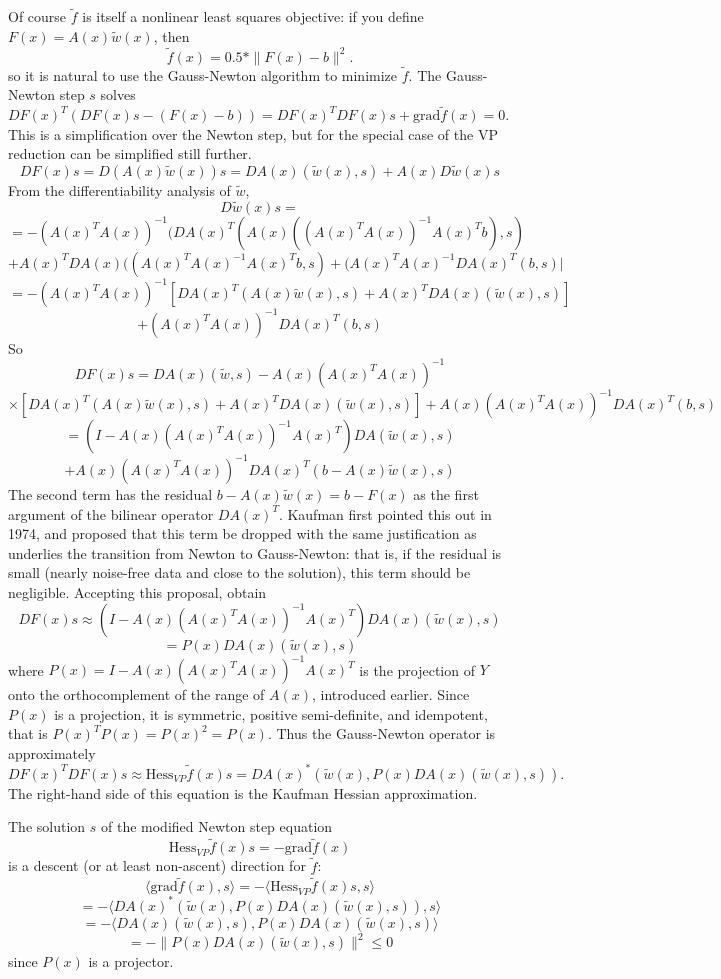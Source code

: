 Of course $\tilde{f}$ is itself a nonlinear least squares objective: if you define $F(x)=A(x)\tilde{w}(x)$, then 
$$
\tilde{f}(x) = 0.5*\|F(x)-b\|^2.
$$
so it is natural to use the Gauss-Newton algorithm to minimize $\tilde{f}$. The Gauss-Newton step $s$ solves $DF(x)^T(DF(x)s-(F(x)-b))=DF(x)^TDF(x)s+\mbox{grad}\tilde{f}(x)=0$. This is a simplification over the Newton step, but for the special case of the VP reduction can be simplified still further.
$$
DF(x)s = D(A(x)\tilde{w}(x))s = DA(x)(\tilde{w}(x),s) + A(x)D\tilde{w}(x)s
$$
From the differentiability analysis of $\tilde{w}$,
$$
D\tilde{w}(x)s = 
$$
$$
=-(A(x)^TA(x))^{-1}(DA(x)^T(A(x)((A(x)^TA(x))^{-1}A(x)^Tb),s)
$$
$$
+ A(x)^T DA(x)((A(x)^TA(x)^{-1}A(x)^Tb,s) + (A(x)^TA(x)^{-1}DA(x)^T(b,s)|
$$
$$
= -(A(x)^TA(x))^{-1}[DA(x)^T(A(x)\tilde{w}(x),s) + A(x)^TDA(x)(\tilde{w}(x),s)]
$$
$$
+ (A(x)^TA(x))^{-1}DA(x)^T(b,s)
$$
So 
$$
DF(x)s = DA(x)(\tilde{w},s) - A(x) (A(x)^TA(x))^{-1}
$$
$$
\times [DA(x)^T(A(x)\tilde{w}(x),s) + A(x)^TDA(x)(\tilde{w}(x),s)] + A(x)(A(x)^TA(x))^{-1}DA(x)^T(b,s)
$$
$$
= (I-A(x)(A(x)^TA(x))^{-1}A(x)^T)DA(\tilde{w}(x),s)
$$
$$
+ A(x)(A(x)^TA(x))^{-1}DA(x)^T(b-A(x)\tilde{w}(x),s)
$$
The second term has the residual $b-A(x)\tilde{w}(x)=b-F(x)$ as the first argument of the bilinear operator $DA(x)^T$. Kaufman first pointed this out in 1974, and proposed that this term be dropped with the same justification as underlies the transition from Newton to Gauss-Newton: that is, if the residual is small (nearly noise-free data and close to the solution), this term should be negligible. Accepting this proposal, obtain 
$$
DF(x)s \approx (I-A(x)(A(x)^TA(x))^{-1}A(x)^T)DA(x)(\tilde{w}(x),s)
$$
$$
= P(x)DA(x)(\tilde{w}(x),s)
$$
where $P(x)=I-A(x)(A(x)^TA(x))^{-1}A(x)^T$ is the projection of $Y$ onto the orthocomplement of the range of $A(x)$, introduced earlier.
Since $P(x)$ is a projection, it is symmetric, positive semi-definite, and idempotent, that is $P(x)^TP(x)=P(x)^2=P(x)$. Thus the Gauss-Newton operator is approximately
\begin{equation}
  \label{eqn:kauf}
DF(x)^TDF(x)s \approx \mbox{Hess}_{VP}\tilde{f}(x)s = DA(x)^*(\tilde{w}(x),P(x)DA(x)(\tilde{w}(x),s)).
\end{equation}
The right-hand side of this equation is the Kaufman Hessian approximation.

The solution $s$ of the modified Newton step equation
\begin{equation}
  \label{eqn:NewtVP}
  \mbox{Hess}_{VP}\tilde {f}(x)s=-\mbox{grad}\tilde{f}(x)
\end{equation}
is a descent (or at least non-ascent) direction for $\tilde{f}$:
$$
\langle \mbox{grad}\tilde{f}(x), s \rangle 
= -\langle \mbox{Hess}_{VP}\tilde{f}(x)s, s\rangle 
$$
$$
=-\langle DA(x)^*(\tilde{w}(x),P(x)DA(x)(\tilde{w}(x),s)),s\rangle
$$
$$
= - \langle DA(x)(\tilde{w}(x),s),P(x)DA(x)(\tilde{w}(x),s)\rangle
$$
$$
= -\|P(x)DA(x)(\tilde{w}(x),s)\|^2 \le 0
$$
since $P(x)$ is a projector. 

